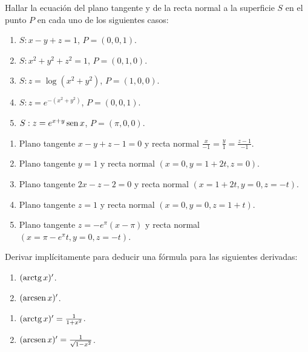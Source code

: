 {Hallar la ecuación del plano tangente y de la recta normal a la superficie $S$ en el punto $P$ en cada uno de los siguientes casos:
\begin{enumerate}
\item $S:x-y+z=1$, $P=(0,0,1)$.
\item $S:x^2+y^2+z^2=1$, $P=(0,1,0)$.
\item $S:z=\log(x^2+y^2)$, $P=(1,0,0)$.
\item $S:z=e^{-(x^2+y^2)}$, $P=(0,0,1)$.
\item $S:z=e^{x+y}\operatorname{sen} x$, $P=(\pi,0,0)$.
\end{enumerate}
}
{\begin{enumerate}
\item Plano tangente $x-y+z-1=0$ y recta normal $\frac{x}{-1}=\frac{y}{1}=\frac{z-1}{-1}$.
\item Plano tangente $y=1$ y recta normal $(x=0, y=1+2t, z=0)$.
\item Plano tangente $2x-z-2=0$ y recta normal $(x=1+2t, y=0, z=-t)$.
\item Plano tangente $z=1$ y recta normal $(x=0, y=0, z=1+t)$.
\item Plano tangente $z=-e^\pi(x-\pi)$ y recta normal $(x=\pi-e^\pi t, y=0, z=-t)$.
\end{enumerate}
}
{
}


{Derivar implícitamente para deducir una fórmula para las siguientes derivadas:
\begin{enumerate}
\item $(\operatorname{arctg} x)'$.
\item $(\operatorname{arcsen} x)'$.
\end{enumerate}
}
{\begin{enumerate}
\item $(\operatorname{arctg} x)'=\frac{1}{1+x^2}$.
\item $(\operatorname{arcsen} x)' = \frac{1}{\sqrt{1-x^2}}$.
\end{enumerate}
}
{
}
